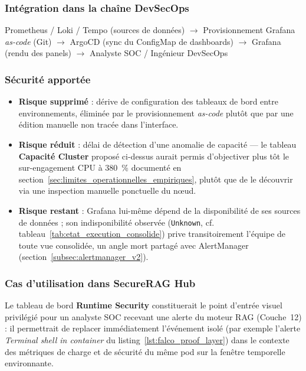 \subsubsection{Intégration dans la chaîne DevSecOps}
\begin{center}
\scriptsize
Prometheus / Loki / Tempo (sources de données) $\rightarrow$ Provisionnement Grafana \textit{as-code} (Git) $\rightarrow$ ArgoCD (sync du ConfigMap de dashboards) $\rightarrow$ Grafana (rendu des panels) $\rightarrow$ Analyste SOC / Ingénieur DevSecOps
\end{center}

\subsubsection{Sécurité apportée}
\begin{itemize}
    \item \textbf{Risque supprimé} : dérive de configuration des tableaux de bord entre environnements, éliminée par le provisionnement \textit{as-code} plutôt que par une édition manuelle non tracée dans l'interface.
    \item \textbf{Risque réduit} : délai de détection d'une anomalie de capacité — le tableau \textbf{Capacité Cluster} proposé ci-dessus aurait permis d'objectiver plus tôt le sur-engagement CPU à 380~\% documenté en section~\ref{sec:limites_operationnelles_empiriques}, plutôt que de le découvrir via une inspection manuelle ponctuelle du nœud.
    \item \textbf{Risque restant} : Grafana lui-même dépend de la disponibilité de ses sources de données ; son indisponibilité observée (\texttt{Unknown}, cf. tableau~\ref{tab:etat_execution_consolide}) prive transitoirement l'équipe de toute vue consolidée, un angle mort partagé avec AlertManager (section~\ref{subsec:alertmanager_v2}).
\end{itemize}

\subsubsection{Cas d'utilisation dans SecureRAG Hub}
Le tableau de bord \textbf{Runtime Security} constituerait le point d'entrée visuel privilégié pour un analyste SOC recevant une alerte du moteur RAG (Couche~12) : il permettrait de replacer immédiatement l'événement isolé (par exemple l'alerte \textit{Terminal shell in container} du listing~\ref{lst:falco_proof_layer}) dans le contexte des métriques de charge et de sécurité du même pod sur la fenêtre temporelle environnante.

